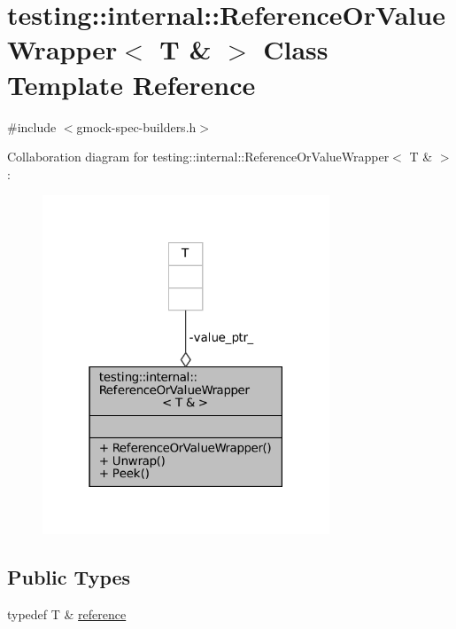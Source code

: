 \hypertarget{classtesting_1_1internal_1_1ReferenceOrValueWrapper_3_01T_01_6_01_4}{}\section{testing\+:\+:internal\+:\+:Reference\+Or\+Value\+Wrapper$<$ T \& $>$ Class Template Reference}
\label{classtesting_1_1internal_1_1ReferenceOrValueWrapper_3_01T_01_6_01_4}


{\ttfamily \#include $<$gmock-\/spec-\/builders.\+h$>$}



Collaboration diagram for testing\+:\+:internal\+:\+:Reference\+Or\+Value\+Wrapper$<$ T \& $>$\+:
\nopagebreak
\begin{figure}[H]
\begin{center}
\leavevmode
\includegraphics[width=243pt]{classtesting_1_1internal_1_1ReferenceOrValueWrapper_3_01T_01_6_01_4__coll__graph}
\end{center}
\end{figure}
\subsection*{Public Types}
\begin{DoxyCompactItemize}
\item 
typedef T \& \hyperlink{classtesting_1_1internal_1_1ReferenceOrValueWrapper_3_01T_01_6_01_4_a62e7f6ebcf40daa08130ea52fd0215ee}{reference}
\end{DoxyCompactItemize}
